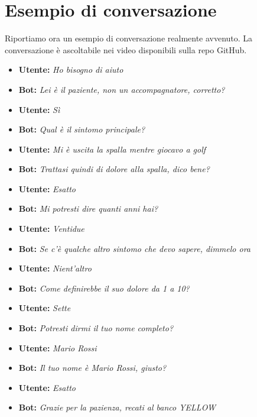 \section{Esempio di conversazione}
Riportiamo ora un esempio di conversazione realmente avvenuto. La conversazione è ascoltabile nei video disponibili sulla repo GitHub\cite{media:videos}.
\begin{itemize}
    \item \textbf{Utente:} \textit{Ho bisogno di aiuto}
    \item \textbf{Bot:} \textit{Lei è il paziente, non un accompagnatore, corretto?}
    \item \textbf{Utente:} \textit{Sì}
    \item \textbf{Bot:} \textit{Qual è il sintomo principale?}
    \item \textbf{Utente:} \textit{Mi è uscita la spalla mentre giocavo a golf}
    \item \textbf{Bot:} \textit{Trattasi quindi di dolore alla spalla, dico bene?}
    \item \textbf{Utente:} \textit{Esatto}
    \item \textbf{Bot:} \textit{Mi potresti dire quanti anni hai?}
    \item \textbf{Utente:} \textit{Ventidue}
    \item \textbf{Bot:} \textit{Se c'è qualche altro sintomo che devo sapere, dimmelo ora}
    \item \textbf{Utente:} \textit{Nient'altro}
    \item \textbf{Bot:} \textit{Come definirebbe il suo dolore da 1 a 10?}
    \item \textbf{Utente:} \textit{Sette}
    \item \textbf{Bot:} \textit{Potresti dirmi il tuo nome completo?}
    \item \textbf{Utente:} \textit{Mario Rossi}
    \item \textbf{Bot:} \textit{Il tuo nome è Mario Rossi, giusto?}
    \item \textbf{Utente:} \textit{Esatto}
    \item \textbf{Bot:} \textit{Grazie per la pazienza, recati al banco YELLOW}
\end{itemize}
